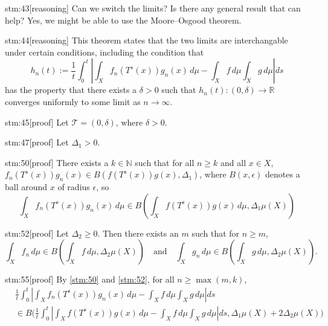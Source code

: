 \begin{stm}{stm:43}[reasoning]
Can we switch the limits? Is there any general result that can help? Yes, we might be able to use the Moore–Osgood theorem.
\end{stm}

\begin{stm}{stm:44}[reasoning]
This theorem states that the two limits are interchangable under certain conditions, including the condition that
$$
h_n(t) := \frac{1}{t} \int_0^t 
\left| \int_X f_n(T^s(x)) g_n(x) \, d\mu 
- \int_X f \, d\mu \int_X g \, d\mu \right| ds
$$
has the property that there exists a $\delta > 0$ such that $h_n(t): (0,\delta) \rightarrow \mathbb{R}$ converges uniformly to some limit as $n \rightarrow \infty$.
\end{stm}

\begin{stm}{stm:45}[proof]
Let $\mathcal{T} = (0,\delta)$, where $\delta > 0$.
\end{stm}

\begin{stm}{stm:47}[proof]
Let $\Delta_1 > 0$.
\end{stm}

\begin{stm}{stm:50}[proof]
There exists a $ k \in \mathbb{N}$ such that for all $ n \geq k $ and all $x \in X$, $f_n(T^s(x)) g_n(x) \in B(f(T^s(x)) g(x), \Delta_1)$, where $B(x,\epsilon)$ denotes a ball around $x$ of radius $\epsilon$, so
\[
\int_X f_n(T^s(x)) g_n(x) \, d\mu 
\in B \left( \int_X f(T^s(x)) g(x) \, d\mu, \Delta_1 \mu(X) \right)
\]
\end{stm}

\begin{stm}{stm:52}[proof]
Let $\Delta_2 \geq 0$. Then there exists an $m$ such that for $n \geq m$,
\[
\int_X f_n \, d\mu \in B \left( \int_X f \, d\mu, \Delta_2 \mu(X) \right)
\quad \text{and} \quad 
\int_X g_n \, d\mu \in B \left( \int_X g \, d\mu, \Delta_2 \mu(X) \right).
\]
\end{stm}

\begin{stm}{stm:55}[proof]
By \ref{stm:50} and \ref{stm:52}, for all $n \geq \max(m,k)$,
\begin{align*}
&\frac{1}{t} \int_0^t \left| \int_X f_n(T^s(x)) g_n(x) \, d\mu 
- \int_X f \, d\mu \int_X g \, d\mu \right| ds \\
&\in B \Big( \frac{1}{t} \int_0^t \left| \int_X f(T^s(x)) g(x) \, d\mu 
- \int_X f \, d\mu \int_X g \, d\mu \right| ds, \Delta_1 \mu(X) + 2 \Delta_2 \mu(X) \Big)
\end{align*}
\end{stm}

